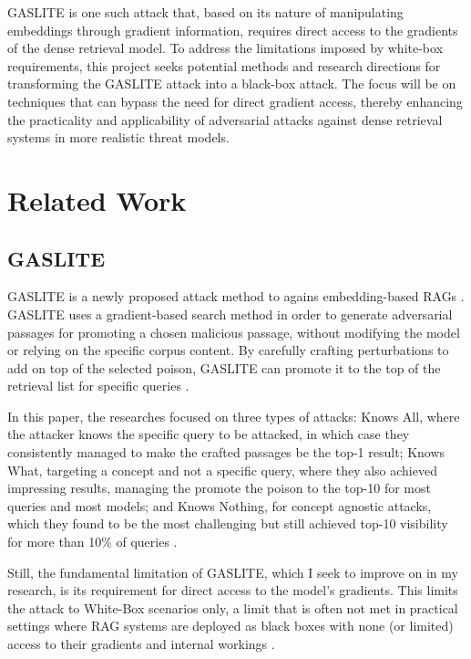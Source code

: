 \documentclass[a4paper, sigconf]{acmart}
\begin{document}
GASLITE is one such attack that, based on its nature of manipulating embeddings through gradient information, requires direct access to the gradients of the dense retrieval model. To address the limitations imposed by white-box requirements, this project seeks potential methods and research directions for transforming the GASLITE attack into a black-box attack. The focus will be on techniques that can bypass the need for direct gradient access, thereby enhancing the practicality and applicability of adversarial attacks against dense retrieval systems in more realistic threat models.


\section{Related Work}

\subsection{GASLITE}

GASLITE is a newly proposed attack method to agains embedding-based RAGs \cite{bentov2024}. 
GASLITE uses a gradient-based search method in order to generate adversarial passages for promoting a chosen malicious passage, without modifying the model or relying on the specific corpus content. 
By carefully crafting perturbations to add on top of the selected poison, GASLITE can promote it to the top of the retrieval list for specific queries \cite{bentov2024}.

In this paper, the researches focused on three types of attacks: Knows All, where the attacker knows the specific query to be attacked, in which case they consistently managed to make the crafted passages be the top-1 result; Knows What, targeting a concept and not a specific query, where they also achieved impressing results, managing the promote the poison to the top-10 for most queries and most models; and Knows Nothing, for concept agnostic attacks, which they found to be the most challenging but still achieved top-10 visibility for more than 10\% of queries \cite{bentov2024}.
 
Still, the fundamental limitation of GASLITE, which I seek to improve on in my research, is its requirement for direct access to the model's gradients. This limits the attack to White-Box scenarios only, a limit that is often not met in practical settings where RAG systems are deployed as black boxes with none (or limited) access to their gradients and internal workings \cite{bentov2024}. 
\end{document}
